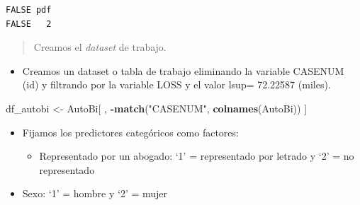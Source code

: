 \documentclass[]{book}
\newenvironment{Shaded}{\begin{snugshade}}{\end{snugshade}}
\newcommand{\DataTypeTok}[1]{\textcolor[rgb]{0.13,0.29,0.53}{#1}}
\newcommand{\DecValTok}[1]{\textcolor[rgb]{0.00,0.00,0.81}{#1}}
\newcommand{\KeywordTok}[1]{\textcolor[rgb]{0.13,0.29,0.53}{\textbf{#1}}}
\newcommand{\NormalTok}[1]{#1}
\newcommand{\OperatorTok}[1]{\textcolor[rgb]{0.81,0.36,0.00}{\textbf{#1}}}
\newcommand{\StringTok}[1]{\textcolor[rgb]{0.31,0.60,0.02}{#1}}
\providecommand{\tightlist}{%
  \setlength{\itemsep}{0pt}\setlength{\parskip}{0pt}}
\begin{document}
\begin{verbatim}
FALSE pdf 
FALSE   2
\end{verbatim}

\begin{quote}
Creamos el \emph{dataset} de trabajo.
\end{quote}

\begin{itemize}
\tightlist
\item
  Creamos un dataset o tabla de trabajo eliminando la variable CASENUM (id) y filtrando por la variable LOSS y el valor lsup= 72.22587 (miles).
\end{itemize}

\begin{Shaded}
\begin{Highlighting}[]
\NormalTok{df_autobi <-}\StringTok{ }\NormalTok{AutoBi[ , }\OperatorTok{-}\KeywordTok{match}\NormalTok{(}\StringTok{"CASENUM"}\NormalTok{, }\KeywordTok{colnames}\NormalTok{(AutoBi)) ] }
\end{Highlighting}
\end{Shaded}

\begin{itemize}
\item
  Fijamos los predictores categóricos como factores:

  \begin{itemize}
  \tightlist
  \item
    Representado por un abogado: `1' = representado por letrado y `2' = no representado
  \end{itemize}
\end{itemize}

\begin{Shaded}
\end{Shaded}

\begin{itemize}
\tightlist
\item
  Sexo: `1' = hombre y `2' = mujer
\end{itemize}

\begin{Shaded}
\end{Shaded}
\end{document}
